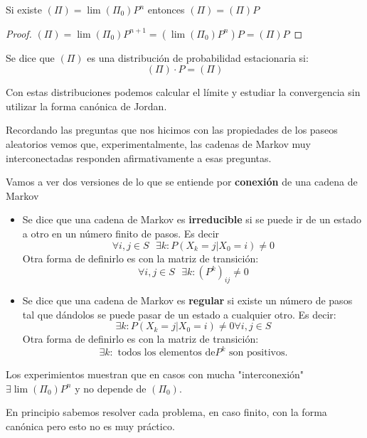 \obs Si existe $\left(\Pi\right) = \lim \left(\Pi_0\right) P^n$ entonces $\left(\Pi\right) = \left(\Pi\right) P$
\begin{proof}
	$\left(\Pi\right) = \lim\left(\Pi_0\right) P^{n+1} = \left(\lim \left(\Pi_0\right)P^n\right)P = \left(\Pi\right) P$
\end{proof}

\begin{defn}
	Se dice que $\left(\Pi\right)$ es una distribución de probabilidad estacionaria si:
	$$\left(\Pi\right)\cdot P = \left(\Pi\right)$$
\end{defn}

\obs Con estas distribuciones podemos calcular el límite y estudiar la convergencia sin utilizar la forma canónica de Jordan.


Recordando las preguntas que nos hicimos con las propiedades de los paseos aleatorios vemos que, experimentalmente, las cadenas de Markov muy interconectadas responden afirmativamente a esas preguntas.

Vamos a ver dos versiones de lo que se entiende por \textbf{conexión} de una cadena de Markov
\newpage
\begin{itemize}
	\item \begin{defn}[Irreducible]
		Se dice que una cadena de Markov es \textbf{irreducible} si se puede ir de un estado a otro en un número finito de pasos. Es decir
		$$\forall i,j \in S\text{    }\exists k : P(X_k = j| X_0 = i) \neq 0$$
		Otra forma de definirlo es con la matriz de transición:
		$$\forall i,j \in S \text{    }\exists k: (P^k)_{ij} \neq 0$$
	\end{defn}
	\item \begin{defn}[Regular]
		Se dice que una cadena de Markov es \textbf{regular} si existe un número de pasos tal que dándolos se puede pasar de un estado a cualquier otro. Es decir:
		$$ \exists k : P(X_k = j| X_0 = i) \neq 0  \forall i,j \in S $$
		Otra forma de definirlo es con la matriz de transición:
		$$\exists k : \text{ todos los elementos de} P^k \text{ son positivos.}$$
	\end{defn}
\end{itemize}


Los experimientos muestran que en casos con mucha "interconexión" $\exists \lim (\Pi_0)P^n$ y no depende de $(\Pi_0)$.

En principio sabemos resolver cada problema, en caso finito, con la forma canónica pero esto no es muy práctico.
